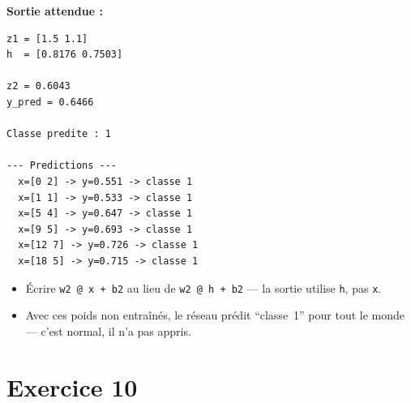 \textbf{Sortie attendue :}
\begin{verbatim}
z1 = [1.5 1.1]
h  = [0.8176 0.7503]

z2 = 0.6043
y_pred = 0.6466

Classe predite : 1

--- Predictions ---
  x=[0 2] -> y=0.551 -> classe 1
  x=[1 1] -> y=0.533 -> classe 1
  x=[5 4] -> y=0.647 -> classe 1
  x=[9 5] -> y=0.693 -> classe 1
  x=[12 7] -> y=0.726 -> classe 1
  x=[18 5] -> y=0.715 -> classe 1
\end{verbatim}

\begin{attentionbox}
\begin{itemize}
    \item \'{E}crire \texttt{w2 @ x + b2} au lieu de \texttt{w2 @ h + b2} --- la sortie utilise \texttt{h}, pas \texttt{x}.
    \item Avec ces poids non entra\^{i}n\'{e}s, le r\'{e}seau pr\'{e}dit ``classe~1'' pour tout le monde --- c'est normal, il n'a pas appris.
\end{itemize}
\end{attentionbox}

\section*{Exercice 10 \hfill \exointermediaire}

\separateur


